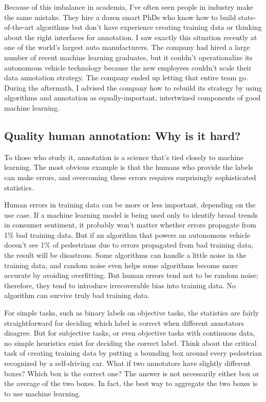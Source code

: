 \documentclass[sigconf,nonacm,screen,pbalance]{acmart}
\begin{document}
Because of this imbalance in academia, I've often seen people in industry make the same mistake. They hire a dozen smart PhDs who know how to build state-of-the-art algorithms but don't have experience creating training data or thinking about the right interfaces for annotation. I saw exactly this situation recently at one of the world's largest auto manufacturers. The company had hired a large number of recent machine learning graduates, but it couldn't operationalize its autonomous vehicle technology because the new employees couldn't scale their data annotation strategy. The company ended up letting that entire team go. During the aftermath, I advised the company how to rebuild its strategy by using algorithms and annotation as equally-important, intertwined components of good machine learning.

\subsection{Quality human annotation: Why is it hard?}
To those who study it, annotation is a science that's tied closely to machine learning. The most obvious example is that the humans who provide the labels can make errors, and overcoming these errors requires surprisingly sophisticated statistics.

Human errors in training data can be more or less important, depending on the use case. If a machine learning model is being used only to identify broad trends in consumer sentiment, it probably won't matter whether errors propagate from 1\% bad training data. But if an algorithm that powers an autonomous vehicle doesn't see 1\% of pedestrians due to errors propagated from bad training data, the result will be disastrous. Some algorithms can handle a little noise in the training data, and random noise even helps some algorithms become more accurate by avoiding overfitting. But human errors tend not to be random noise; therefore, they tend to introduce irrecoverable bias into training data. No algorithm can survive truly bad training data.

For simple tasks, such as binary labels on objective tasks, the statistics are fairly straightforward for deciding which label is correct when different annotators disagree. But for subjective tasks, or even objective tasks with continuous data, no simple heuristics exist for deciding the correct label. Think about the critical task of creating training data by putting a bounding box around every pedestrian recognized by a self-driving car. What if two annotators have slightly different boxes? Which box is the correct one? The answer is not necessarily either box or the average of the two boxes. In fact, the best way to aggregate the two boxes is to use machine learning.
\end{document}
